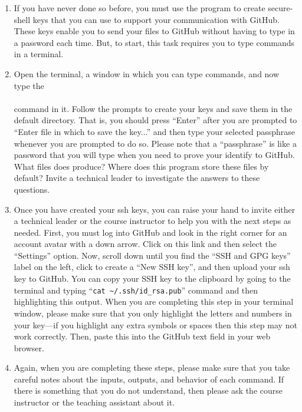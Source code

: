 \begin{enumerate}
  \item If you have never done so before, you must use the  program to create secure-shell keys that you can use to support your communication with GitHub. These keys enable you to send your files to GitHub without having to type in a password each time.  But, to start, this task requires you to type commands in a terminal. 

  \item Open the terminal, a window in which you can type commands, and now type the \\
  \\ command in it. Follow the prompts to create your keys and save them in the default directory. That is, you should press ``Enter'' after you are prompted to ``Enter file in which to save the key...'' and then type your selected passphrase whenever you are prompted to do so. Please note that a ``passphrase'' is like a password that you will type when you need to prove your identify to GitHub. What files does  produce? Where does this program store these files by default? Invite a technical leader to investigate the answers to these questions.

  \item Once you have created your ssh keys, you can raise your hand to invite either a technical leader or the course instructor to help you with the next steps as needed. First, you must log into GitHub and look in the right corner for an account avatar with a down arrow. Click on this link  and then select the ``Settings'' option. Now, scroll down until you find the ``SSH and GPG keys'' label on the left, click to create a ``New SSH key'', and then upload your ssh key to GitHub. You can copy your SSH key to the clipboard by going to the terminal and typing ``{\tt cat \textasciitilde{}/.ssh/id\_rsa.pub}'' command and then highlighting this output. When you are completing this step in your terminal window, please make sure that you only highlight the letters and numbers in your key---if you highlight any extra symbols or spaces then this step may not work correctly. Then, paste this into the GitHub text field in your web browser.

  \item Again, when you are completing these steps, please make sure that you take careful notes about the inputs, outputs, and behavior of each command. If there is something that you do not understand, then please ask the course instructor or the teaching assistant about it.

\end{enumerate}


